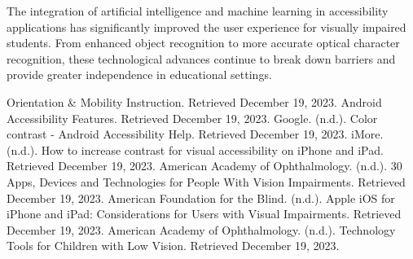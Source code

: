 The integration of artificial intelligence and machine learning in accessibility applications has significantly improved the user experience for visually impaired students. From enhanced object recognition to more accurate optical character recognition, these technological advances continue to break down barriers and provide greater independence in educational settings.

\begin{thebibliography}{99}
 Orientation \& Mobility Instruction. Retrieved December 19, 2023.
 Android Accessibility Features. Retrieved December 19, 2023.
 Google. (n.d.). Color contrast - Android Accessibility Help. Retrieved December 19, 2023.
 iMore. (n.d.). How to increase contrast for visual accessibility on iPhone and iPad. Retrieved December 19, 2023.
 American Academy of Ophthalmology. (n.d.). 30 Apps, Devices and Technologies for People With Vision Impairments. Retrieved December 19, 2023.
 American Foundation for the Blind. (n.d.). Apple iOS for iPhone and iPad: Considerations for Users with Visual Impairments. Retrieved December 19, 2023.
 American Academy of Ophthalmology. (n.d.). Technology Tools for Children with Low Vision. Retrieved December 19, 2023.
\end{thebibliography}
